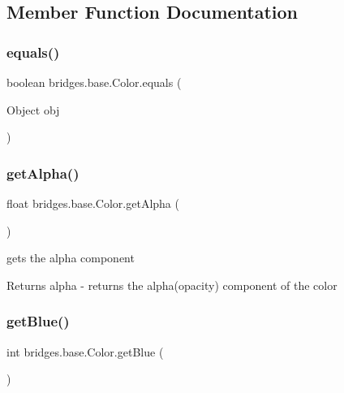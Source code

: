 \subsection{Member Function Documentation}
\mbox{\label{classbridges_1_1base_1_1_color_a81fb4cb13c05a3da2f29f48b07189e7c}} 
\subsubsection{\texorpdfstring{equals()}{equals()}}
{\footnotesize\ttfamily boolean bridges.\+base.\+Color.\+equals (\begin{DoxyParamCaption}\item[{Object}]{obj }\end{DoxyParamCaption})}

\mbox{\label{classbridges_1_1base_1_1_color_a7c4247e31ecd8fcc61ef208d5deefe68}} 
\subsubsection{\texorpdfstring{getAlpha()}{getAlpha()}}
{\footnotesize\ttfamily float bridges.\+base.\+Color.\+get\+Alpha (\begin{DoxyParamCaption}{ }\end{DoxyParamCaption})}

gets the alpha component

\begin{DoxyReturn}{Returns}
alpha -\/ returns the alpha(opacity) component of the color 
\end{DoxyReturn}
\mbox{\label{classbridges_1_1base_1_1_color_ad4b82e1eb9ff59857d2868edd8d4ce65}} 
\subsubsection{\texorpdfstring{getBlue()}{getBlue()}}
{\footnotesize\ttfamily int bridges.\+base.\+Color.\+get\+Blue (\begin{DoxyParamCaption}{ }\end{DoxyParamCaption})}


